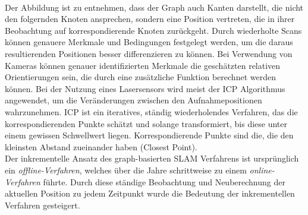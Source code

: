 \\ 
Der Abbildung ist zu entnehmen, dass der Graph auch Kanten darstellt, die nicht den folgernden Knoten ansprechen, sondern eine 
Position vertreten, die in ihrer Beobachtung auf korrespondierende Knoten zurückgeht. Durch wiederholte Scans können genauere Merkmale und 
Bedingungen festgelegt werden, um die daraus resultierenden Positionen besser differenzieren zu können. Bei Verwendung von Kameras können 
genauer identifizierten Merkmale die geschätzten relativen Orientierungen sein, die durch eine zusätzliche Funktion berechnet werden 
können. Bei der Nutzung eines Lasersensors wird meist der \ac{ICP} Algorithmus angewendet, um die Veränderungen zwischen den Aufnahmepositionen 
wahrzunehmen. \acs{ICP} ist ein iteratives, ständig wiederholendes Verfahren, das die korrespondierenden Punkte schätzt und solange transformiert, bis diese unter 
einem gewissen Schwellwert liegen. Korrespondierende Punkte sind die, die den kleinsten Abstand zueinander haben (Closest Point). \cite{robotik2.2020m}
\\ 
Der inkrementelle Ansatz des graph-basierten \acs{SLAM} Verfahrens ist ursprünglich ein \textit{offline-Verfahren}, welches über die Jahre 
schrittweise zu einem \textit{online-Verfahren} führte. Durch diese ständige Beobachtung und Neuberechnung der aktuellen Position zu jedem 
Zeitpunkt wurde die Bedeutung der inkrementellen Verfahren gesteigert. %

